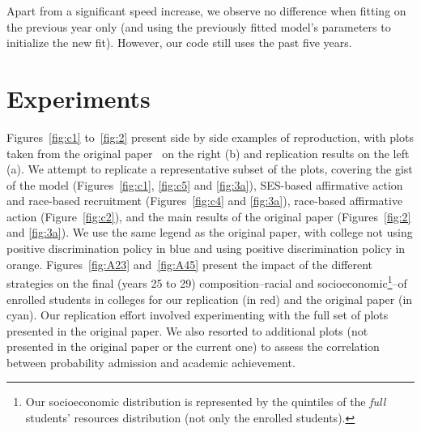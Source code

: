 Apart from a significant speed increase, we observe no difference when fitting on the previous year only (and using the previously fitted model's parameters to initialize the new fit). 
However, our code still uses the past five years.

\section{Experiments}

Figures~\ref{fig:c1} to~\ref{fig:2} present side by side examples of reproduction, with plots taken from the original paper~\cite{reardon2018levels} on the right (b) and replication results on the left (a).
We attempt to replicate a representative subset of the plots, covering the gist of the model (Figures~\ref{fig:c1}, \ref{fig:c5} and \ref{fig:3a}), SES-based affirmative action and race-based recruitment (Figures~\ref{fig:c4} and \ref{fig:3a}), race-based affirmative action (Figure~\ref{fig:c2}), and the main results of the original paper (Figures~\ref{fig:2}  and \ref{fig:3a}). We use the same legend as the original paper, with college not using positive discrimination policy in \colorbox{sns-blue}{blue} and using positive discrimination policy in \colorbox{sns-orange}{orange}.
Figures~\ref{fig:A23} and~\ref{fig:A45} present the impact of the different strategies on the final (years 25 to 29) composition--racial and socioeconomic\footnote{Our socioeconomic distribution is represented by the quintiles of the \emph{full} students' resources distribution (not only the enrolled students).}--of enrolled students in colleges for our replication (in \colorbox{sns-red}{red}) and the original paper (in \colorbox{sns-cyan}{cyan}).
Our replication effort involved experimenting with the full set of plots presented in the original paper. 
We also resorted to additional plots (not presented in the original paper or the current one) to assess the correlation between probability admission and academic achievement.

